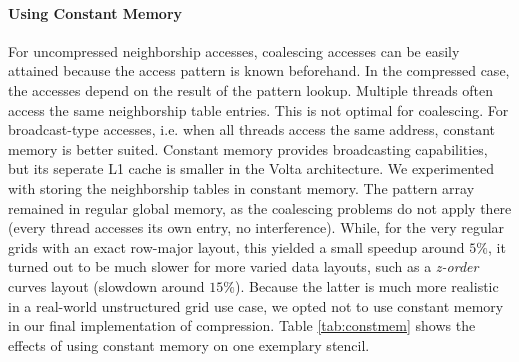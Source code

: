 \paragraph{Using Constant Memory} For uncompressed neighborship accesses, coalescing accesses can be easily attained because the access pattern is known beforehand. In the compressed case, the accesses depend on the result of the pattern lookup. Multiple threads often access the same neighborship table entries. This is not optimal for coalescing. For broadcast-type accesses, i.e. when all threads access the same address, constant memory is better suited. Constant memory provides broadcasting capabilities, but its seperate L1 cache is smaller in the Volta architecture. We experimented with storing the neighborship tables in constant memory. The pattern array remained in regular global memory, as the coalescing problems do not apply there (every thread accesses its own entry, no interference). While, for the very regular grids with an exact row-major layout, this yielded a small speedup around $5\%$, it turned out to be much slower for more varied data layouts, such as a \emph{z-order} curves layout (slowdown around $15\%$). Because the latter is much more realistic in a real-world unstructured grid use case, we opted not to use constant memory in our final implementation of compression. Table \ref{tab:constmem} shows the effects of using constant memory on one exemplary stencil.

